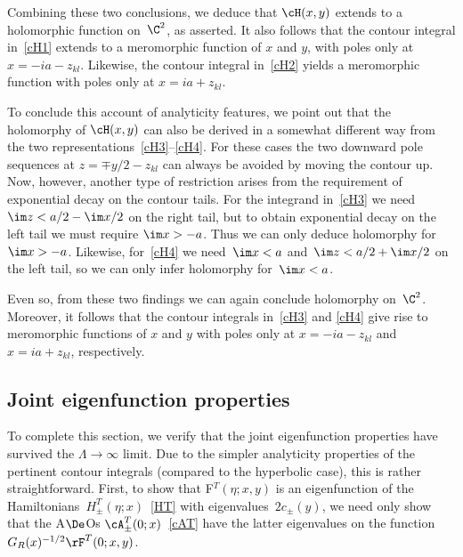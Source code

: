 \documentclass[pdftex]{sigma}
\numberwithin{equation}{section}
\begin{document}
Combining these two conclusions, we deduce that $\cH(x,y)$ extends to a holomorphic function on~$\C^2$, as asserted. It also follows that the contour integral in~\eqref{cH1} extends to a meromorphic function of $x$ and $y$, with poles only at $x=-ia-z_{kl}$. Likewise, the contour integral in~\eqref{cH2} yields a meromorphic function with poles only at $x=ia+z_{kl}$.

To conclude this account of analyticity features, we point out that the holomorphy of $\cH(x,y)$ can also be derived in a somewhat dif\/ferent way from the two representations~\eqref{cH3}--\eqref{cH4}. For these cases the two downward pole sequences at $z=\mp y/2-z_{kl}$ can always be avoided by moving the contour up. Now, however, another type of restriction arises from the requirement of exponential decay on the contour tails. For the integrand in~\eqref{cH3} we need $\im z<a/2-\im x/2$ on the right tail, but to obtain exponential decay on the left tail we must require $\im x>-a$. Thus we can only deduce holomorphy for $\im x>-a$. Likewise, for~\eqref{cH4} we need~$\im x<a$ and~$\im z<a/2+\im x/2$ on the left tail, so we can only infer holomorphy for~$\im x<a$.

Even so, from these two f\/indings we can again conclude holomorphy on~$\C^2$.  Moreover, it follows that the contour integrals in~\eqref{cH3} and \eqref{cH4} give rise  to meromorphic functions of $x$ and $y$ with poles only at $x=-ia-z_{kl}$ and  $x=ia+z_{kl}$, respectively.

\subsection{Joint eigenfunction properties}\label{section5.3}

To complete this section, we verify that the joint eigenfunction properties have survived the \mbox{$\Lambda\to\infty$} limit. Due to the simpler analyticity properties of the pertinent contour integrals (compared to the hyperbolic case), this is rather straightforward. First, to show that F$^T(\eta;x,y)$ is an eigenfunction of the Hamiltonians~$H^T_{\pm}(\eta;x)$~\eqref{HT} with eigenvalues~$2c_{\pm}(y)$, we need only show that the A$\De$Os $\cA^T_{\pm}(0;x)$~\eqref{cAT} have the latter eigenvalues on the function~$G_R(x)^{-1/2}\rF^T (0;x,y)$.
\end{document}
